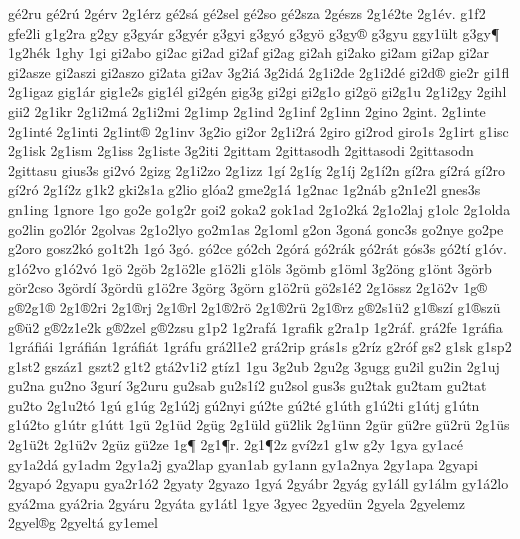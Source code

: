 {g^^e92ru
g^^e92r^^fa
2g^^e9rv
2g1^^e9rz
g^^e92s^^e1
g^^e92sel
g^^e92so
g^^e92sza
2g^^e9szs
2g1^^e92te
2g1^^e9v.
g1f2
gfe2li
g1g2ra
g2gy
g3gy^^e1r
g3gy^^e9r
g3gyi
g3gy^^f3
g3gy^^f6
g3gy^^ae
g3gyu
ggy1^^fclt
g3gy^^b6
1g2h^^e9k
1ghy
1gi
gi2abo
gi2ac
gi2ad
gi2af
gi2ag
gi2ah
gi2ako
gi2am
gi2ap
gi2ar
gi2asze
gi2aszi
gi2aszo
gi2ata
gi2av
3g2i^^e1
3g2id^^e1
2g1i2de
2g1i2d^^e9
gi2d^^ae
gie2r
gi1fl
2g1igaz
gig1^^e1r
gig1e2s
gig1^^e9l
gi2g^^e9n
gig3g
gi2gi
gi2g1o
gi2g^^f6
gi2g1u
2g1i2gy
2gihl
gii2
2g1ikr
2g1i2m^^e1
2g1i2mi
2g1imp
2g1ind
2g1inf
2g1inn
2gino
2gint.
2g1inte
2g1int^^e9
2g1inti
2g1int^^ae
2g1inv
3g2io
gi2or
2g1i2r^^e1
2giro
gi2rod
giro1s
2g1irt
g1isc
2g1isk
2g1ism
2g1iss
2g1iste
3g2iti
2gittam
2gittasodh
2gittasodi
2gittasodn
2gittasu
gius3s
gi2v^^f3
2gizg
2g1i2zo
2g1izz
1g^^ed
2g1^^edg
2g1^^edj
2g1^^ed2n
g^^ed2ra
g^^ed2r^^e1
g^^ed2ro
g^^ed2r^^f3
2g1^^ed2z
g1k2
gki2s1a
g2lio
gl^^f3a2
gme2g1^^e1
1g2nac
1g2n^^e1b
g2n1e2l
gnes3s
gn1ing
1gnore
1go
go2e
go1g2r
goi2
goka2
gok1ad
2g1o2k^^e1
2g1o2laj
g1olc
2g1olda
go2lin
go2l^^f3r
2golvas
2g1o2lyo
go2m1as
2g1oml
g2on
3gon^^e1
gonc3s
go2nye
go2pe
g2oro
gosz2k^^f3
go1t2h
1g^^f3
3g^^f3.
g^^f32ce
g^^f32ch
2g^^f3r^^e1
g^^f32r^^e1k
g^^f32r^^e1t
g^^f3s3s
g^^f32t^^ed
g1^^f3v.
g1^^f32vo
g1^^f32v^^f3
1g^^f6
2g^^f6b
2g1^^f62le
g1^^f62li
g1^^f6ls
3g^^f6mb
g1^^f6ml
3g2^^f6ng
g1^^f6nt
3g^^f6rb
g^^f6r2cso
3g^^f6rd^^ed
3g^^f6rd^^fc
g1^^f62re
3g^^f6rg
3g^^f6rn
g1^^f62r^^fc
g^^f62s1^^e92
2g1^^f6ssz
2g1^^f62v
1g^^ae
g^^ae2g1^^ae
2g1^^ae2ri
2g1^^aerj
2g1^^aerl
2g1^^ae2r^^f6
2g1^^ae2r^^fc
2g1^^aerz
g^^ae2s1^^fc2
g1^^aesz^^ed
g1^^aesz^^fc
g^^ae^^fc2
g^^ae2z1e2k
g^^ae2zel
g^^ae2zsu
g1p2
1g2raf^^e1
1grafik
g2ra1p
1g2r^^e1f.
gr^^e12fe
1gr^^e1fia
1gr^^e1fi^^e1i
1gr^^e1fi^^e1n
1gr^^e1fi^^e1t
1gr^^e1fu
gr^^e12l1e2
gr^^e12rip
gr^^e1s1s
g2r^^edz
g2r^^f3f
gs2
g1sk
g1sp2
g1st2
gsz^^e1z1
gszt2
g1t2
gt^^e12v1i2
gt^^edz1
1gu
3g2ub
2gu2g
3gugg
gu2il
gu2in
2g1uj
gu2na
gu2no
3gur^^ed
3g2uru
gu2sab
gu2s1^^ed2
gu2sol
gus3s
gu2tak
gu2tam
gu2tat
gu2to
2g1u2t^^f3
1g^^fa
g1^^fag
2g1^^fa2j
g^^fa2nyi
g^^fa2te
g^^fa2t^^e9
g1^^fath
g1^^fa2ti
g1^^fatj
g1^^fatn
g1^^fa2to
g1^^fatr
g1^^fatt
1g^^fc
2g1^^fcd
2g^^fcg
2g1^^fcld
g^^fc2lik
2g1^^fcnn
2g^^fcr
g^^fc2re
g^^fc2r^^fc
2g1^^fcs
2g1^^fc2t
2g1^^fc2v
2g^^fcz
g^^fc2ze
1g^^b6
2g1^^b6r.
2g1^^b62z
gv^^ed2z1
g1w
g2y
1gya
gy1ac^^e9
gy1a2d^^e1
gy1adm
2gy1a2j
gya2lap
gyan1ab
gy1ann
gy1a2nya
2gy1apa
2gyapi
2gyap^^f3
2gyapu
gya2r1^^f32
2gyaty
2gyazo
1gy^^e1
2gy^^e1br
2gy^^e1g
gy1^^e1ll
gy1^^e1lm
gy1^^e12lo
gy^^e12ma
gy^^e12ria
2gy^^e1ru
2gy^^e1ta
gy1^^e1tl
1gye
3gyec
2gyed^^fcn
2gyela
2gyelemz
2gyel^^aeg
2gyelt^^e1
gy1emel
}
